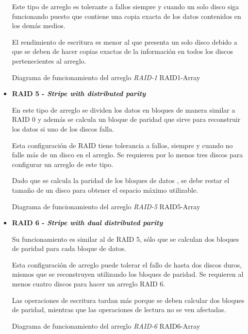 \begin{itemize}
Este tipo de arreglo es tolerante a fallos siempre y cuando un solo disco siga funcionando puesto que contiene una copia exacta de los datos contenidos en los dem\'{a}s medios.

El rendimiento de escritura es menor al que presenta un solo disco debido a que se deben de hacer copias exactas de la informaci\'{o}n en todos los discos pertenecientes al arreglo.

\diagramblock
{Diagrama de funcionamiento del arreglo \textit{RAID-1}}
{RAID1-Array}
{
 {
  
 }
}
\newpage
  \item \textbf{RAID 5 - \textit{Stripe with distributed parity}}

En este tipo de arreglo se dividen los datos en bloques de manera similar a \textsc{RAID} 0 y adem\'{a}s se calcula un bloque de paridad que sirve para reconstruir los datos si uno de los discos falla.

Esta configuraci\'{o}n de \textsc{RAID} tiene tolerancia a fallos, siempre y cuando no falle m\'{a}s de un disco en el arreglo. Se requieren por lo menos tres discos para configurar un arreglo de este tipo.

Dado que se calcula la paridad de los bloques de datos , se debe restar el tama\~{n}o de un disco para obtener el espacio m\'{a}ximo utilizable.

\diagramblock
{Diagrama de funcionamiento del arreglo \textit{RAID-5}}
{RAID5-Array}
{
 {
  
 }
}
\newpage
  \item \textbf{RAID 6 - \textit{Stripe with \textsl{dual} distributed parity}}

Su funcionamiento es similar al de \textsc{RAID} 5, s\'{o}lo que se calculan dos bloques de paridad para cada bloque de datos.

Esta configuraci\'{o}n de arreglo puede tolerar el fallo de hasta dos discos duros, mismos que se reconstruyen utilizando los bloques de paridad. Se requieren al menos cuatro discos para hacer un arreglo \textsc{RAID} 6.

Las operaciones de escritura tardan m\'{a}s porque se deben calcular dos bloques de paridad, mientras que las operaciones de lectura no se ven afectadas.

\diagramblock
{Diagrama de funcionamiento del arreglo \textit{RAID-6}}
{RAID6-Array}
{
 {
  
 }
}

\end{itemize}

